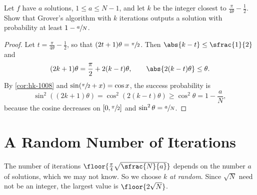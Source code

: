 \begin{exercisebox}
\begin{exercise}\label{ex:iterations-1008}\label{thm:iterations-1008}
    Let $f$ have $a$ solutions, $1 \leq a \leq N - 1$, and let $k$ be the integer closest to
    $\frac{\pi}{4\theta} - \frac{1}{2}$. Show that Grover's algorithm with $k$ iterations outputs a
    solution with probability at least $1 - \sfrac{a}{N}$.
\end{exercise}
\tcblower
\begin{proof}
    Let $t = \frac{\pi}{4\theta} - \frac{1}{2}$, so that $(2t+1)\theta = \sfrac{\pi}{2}$. Then
    $\abs{k - t} \leq \sfrac{1}{2}$ and
    \[(2k+1)\theta = \frac{\pi}{2} + 2(k-t)\theta, \qquad \abs{2(k-t)\theta} \leq \theta.\]
    By \cref{cor:hk-1008} and $\sin(\sfrac{\pi}{2} + x) = \cos x$, the success probability is
    \[\sin^2\left((2k+1)\theta\right) = \cos^2\left(2(k-t)\theta\right) \geq \cos^2\theta = 1 - \frac{a}{N},\]
    because the cosine decreases on $[0, \sfrac{\pi}{2}]$ and $\sin^2\theta = \sfrac{a}{N}$.
\end{proof}
\end{exercisebox}

\section{A Random Number of Iterations}\label{sec:randomk-1008}

The number of iterations $\floor{\frac{\pi}{4}\sqrt{\sfrac{N}{a}}}$ depends on the number $a$ of
solutions, which we may not know. So we choose $k$ \emph{at random}. Since $\sqrt{N}$ need not be an
integer, the largest value is $\floor{2\sqrt{N}}$.


